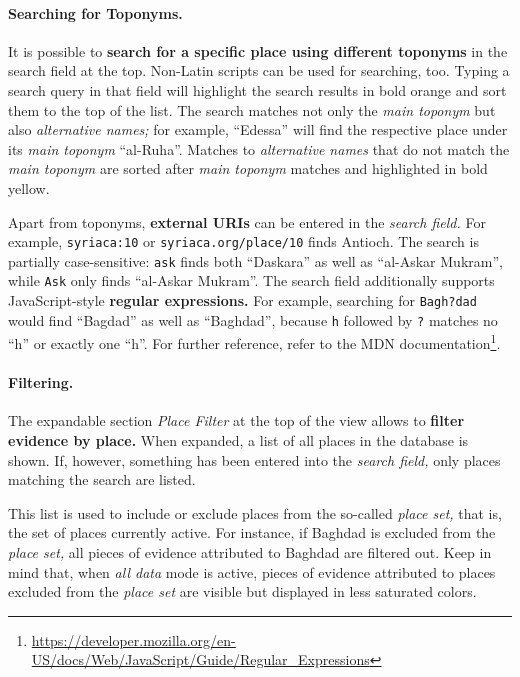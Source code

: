 \paragraph{Searching for Toponyms.}
\label{sec:location-list-search-toponyms}
It is possible to \textbf{search for a specific place using different toponyms} in the search field at the top.
Non-Latin scripts can be used for searching, too.
Typing a search query in that field will highlight the search results in bold orange and sort them to the top of the list.
The search matches not only the \emph{main toponym} but also \emph{alternative names;}
for example, \enquote{Edessa} will find the respective place under its \emph{main toponym} \enquote{al-Ruha}.
Matches to \emph{alternative names} that do not match the \emph{main toponym} are sorted after \emph{main toponym} matches and highlighted in bold yellow.

Apart from toponyms, \textbf{external URIs} can be entered in the \emph{search field.}
For example, \verb!syriaca:10! or \verb!syriaca.org/place/10! finds Antioch.
The search is partially case-sensitive:
\verb!ask! finds both \enquote{Daskara} as well as \enquote{al-Askar Mukram}, while \verb!Ask! only finds \enquote{al-Askar Mukram}.
The search field additionally supports JavaScript-style \textbf{regular expressions.}
For example, searching for \verb!Bagh?dad! would find \enquote{Bagdad} as well as \enquote{Baghdad}, because \verb!h! followed by \verb!?! matches no \enquote{h} or exactly one \enquote{h}.
For further reference, refer to the MDN documentation\footnote{\url{https://developer.mozilla.org/en-US/docs/Web/JavaScript/Guide/Regular_Expressions}}.

\paragraph{Filtering.}
The expandable section \emph{Place Filter} at the top of the view allows to \textbf{filter evidence by place.}
When expanded, a list of all places in the database is shown.
If, however, something has been entered into the \emph{search field,} only places matching the search are listed.

This list is used to include or exclude places from the so-called \emph{place set,}
that is, the set of places currently active.
For instance, if Baghdad is excluded from the \emph{place set,} all pieces of evidence attributed to Baghdad are filtered out.
Keep in mind that, when \emph{all data} mode is active, pieces of evidence attributed to places excluded from the \emph{place set} are visible but displayed in less saturated colors.

